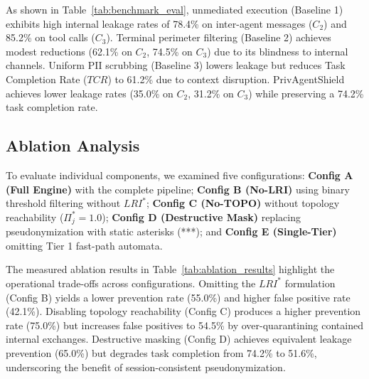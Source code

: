 \documentclass[conference]{IEEEtran}
\begin{document}
As shown in Table~\ref{tab:benchmark_eval}, unmediated execution (Baseline 1) exhibits high internal leakage rates of 78.4\% on inter-agent messages ($C_2$) and 85.2\% on tool calls ($C_3$). Terminal perimeter filtering (Baseline 2) achieves modest reductions (62.1\% on $C_2$, 74.5\% on $C_3$) due to its blindness to internal channels. Uniform PII scrubbing (Baseline 3) lowers leakage but reduces Task Completion Rate ($TCR$) to 61.2\% due to context disruption. PrivAgentShield achieves lower leakage rates (35.0\% on $C_2$, 31.2\% on $C_3$) while preserving a 74.2\% task completion rate.

\subsection{Ablation Analysis}
To evaluate individual components, we examined five configurations: \textbf{Config A (Full Engine)} with the complete pipeline; \textbf{Config B (No-LRI)} using binary threshold filtering without $LRI^*$; \textbf{Config C (No-TOPO)} without topology reachability ($\Pi^*_j = 1.0$); \textbf{Config D (Destructive Mask)} replacing pseudonymization with static asterisks (***); and \textbf{Config E (Single-Tier)} omitting Tier 1 fast-path automata.

\begin{table}[htbp]
\caption{Ablation Study: Security and Utility Measurements}
\label{tab:ablation_results}
\centering
{}
\end{table}

The measured ablation results in Table~\ref{tab:ablation_results} highlight the operational trade-offs across configurations. Omitting the $LRI^*$ formulation (Config B) yields a lower prevention rate (55.0\%) and higher false positive rate (42.1\%). Disabling topology reachability (Config C) produces a higher prevention rate (75.0\%) but increases false positives to 54.5\% by over-quarantining contained internal exchanges. Destructive masking (Config D) achieves equivalent leakage prevention (65.0\%) but degrades task completion from 74.2\% to 51.6\%, underscoring the benefit of session-consistent pseudonymization.
\end{document}
